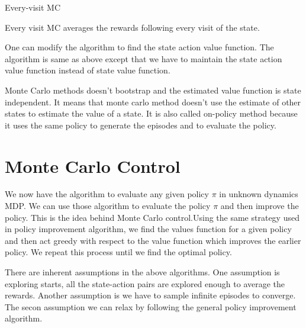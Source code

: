 \documentclass[../main.tex]{subfiles}
\begin{document}
\begin{algorithm}[H]
\caption{Every-visit MC}
\label{alg:every-visit}
\end{algorithm}

Every visit MC  averages the  rewards following every visit of the state. 

One can modify the algorithm to find the state action value function. The algorithm is same as above except that we have to maintain the state action value function instead of state value function.

Monte Carlo methods doesn't bootstrap and the estimated value function is state independent. It means that monte carlo method doesn't use the estimate of other states to estimate the value of a state. It is also called on-policy method because it uses the same policy to generate the episodes and to evaluate the policy.
\section{Monte Carlo Control}
We now have the algorithm to evaluate any given policy $\pi$ in unknown dynamics MDP. We can use those algorithm to evaluate the policy $\pi$ and then improve the policy. This is the idea behind Monte Carlo control.Using the same strategy used in policy improvement  algorithm, we find the values function for a given policy and then act greedy with respect to the value function which improves the earlier policy. We repeat this process until we find the optimal policy.

There are inherent assumptions in the above algorithms. One assumption is exploring starts, all the state-action pairs are explored enough to average the rewards. Another assumption is we have to sample infinite episodes to converge. The secon assumption we can relax by following the general policy improvement algorithm.
\end{document}

